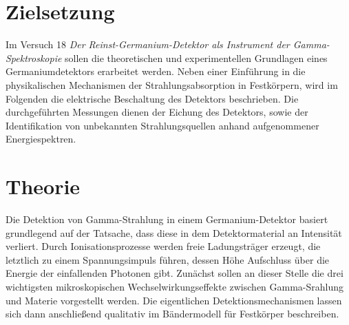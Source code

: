 \setcounter{page}{1}
\section*{Zielsetzung}
Im Versuch 18 \textit{Der Reinst-Germanium-Detektor als
Instrument der Gamma-Spektroskopie} sollen die theoretischen und experimentellen Grundlagen eines
Germaniumdetektors erarbeitet werden. Neben einer Einführung in die physikalischen Mechanismen der
Strahlungsabsorption in Festkörpern, wird im Folgenden die elektrische Beschaltung des Detektors beschrieben. 
Die durchgeführten Messungen dienen der Eichung des Detektors, sowie der Identifikation von unbekannten 
Strahlungsquellen anhand aufgenommener Energiespektren. 

\section{Theorie}
Die Detektion von Gamma-Strahlung in einem Germanium-Detektor basiert grundlegend auf der Tatsache, dass diese in dem 
Detektormaterial an Intensität verliert. Durch Ionisationsprozesse werden freie Ladungsträger erzeugt, die letztlich 
zu einem Spannungsimpuls führen, dessen Höhe Aufschluss über die Energie der einfallenden Photonen gibt. 
Zunächst sollen an dieser Stelle die drei wichtigsten mikroskopischen Wechselwirkungseffekte zwischen Gamma-Srahlung und
Materie vorgestellt werden. Die eigentlichen Detektionsmechanismen lassen sich dann anschließend qualitativ im 
Bändermodell für Festkörper beschreiben.

